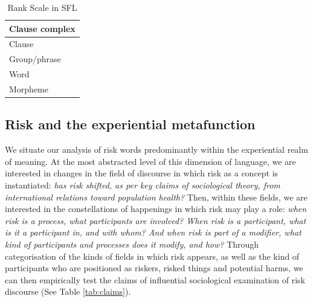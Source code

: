 	\begin{table}
	  \centering
		  \begin{tabular}{|l|}
		  \hline
		  Clause complex \\ \hline
		  Clause		 \\ \hline
		  Group/phrase   \\ \hline
		  Word		   \\ \hline
		  Morpheme	   \\ \hline
		  \end{tabular}
		  \caption{Rank Scale in SFL}
		  \label{tab:rank}
	  \end{table}

		\subsection{Risk and the experiential metafunction}


			We situate our analysis of risk words predominantly within the experiential realm of meaning. At the most abstracted level of this dimension of language, we are interested in changes in the field of discourse in which risk as a concept is instantiated: \emph{has risk shifted, as per key claims of sociological theory, from international relations toward population health?} Then, within these fields, we are interested in the constellations of happenings in which risk may play a role: \emph{when risk is a process, what participants are involved? When risk is a participant, what is it a participant in, and with whom? And when risk is part of a modifier, what kind of participants and processes does it modify, and how?} Through categorisation of the kinds of fields in which risk appears, as well as the kind of participants who are positioned as riskers, risked things and potential harms, we can then empirically test the claims of influential sociological examination of risk discourse (See Table \ref{tab:claims}).


			~\ 
			


